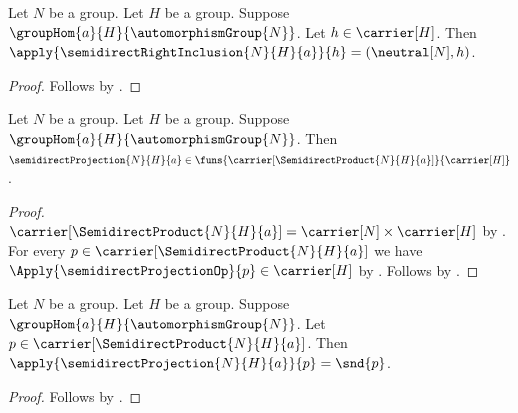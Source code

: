 \begin{proposition}\label{semidirect_right_inclusion_apply}
    Let $N$ be a group.
    Let $H$ be a group.
    Suppose $\groupHom{a}{H}{\automorphismGroup{N}}$.
    Let $h\in\carrier[H]$.
    Then $\apply{\semidirectRightInclusion{N}{H}{a}}{h}=
        (\neutral[N],h)$.
\end{proposition}
\begin{proof}
    Follows by
        .
\end{proof}

\begin{proposition}\label{semidirect_projection_type}
    Let $N$ be a group.
    Let $H$ be a group.
    Suppose $\groupHom{a}{H}{\automorphismGroup{N}}$.
    Then $\semidirectProjection{N}{H}{a}\in
        \funs{\carrier[\SemidirectProduct{N}{H}{a}]}{\carrier[H]}$.
\end{proposition}
\begin{proof}
    $\carrier[\SemidirectProduct{N}{H}{a}]=
        \carrier[N]\times\carrier[H]$ by
        .
    For every $p\in\carrier[\SemidirectProduct{N}{H}{a}]$ we have
        $\Apply{\semidirectProjectionOp}{p}\in\carrier[H]$ by
        .
    Follows by
        .
\end{proof}

\begin{proposition}\label{semidirect_projection_apply}
    Let $N$ be a group.
    Let $H$ be a group.
    Suppose $\groupHom{a}{H}{\automorphismGroup{N}}$.
    Let $p\in\carrier[\SemidirectProduct{N}{H}{a}]$.
    Then $\apply{\semidirectProjection{N}{H}{a}}{p}=\snd{p}$.
\end{proposition}
\begin{proof}
    Follows by
        .
\end{proof}

